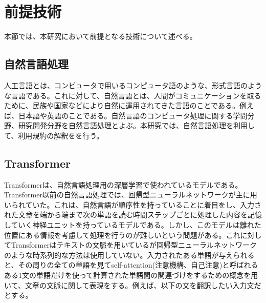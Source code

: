 


\section{前提技術}
本節では、本研究において前提となる技術について述べる。

\subsection{自然言語処理}
人工言語とは、コンピュータで用いるコンピュータ語のような、形式言語のような言語である。これに対して、自然言語とは、人間がコミュニケーションを取るために、民族や国家などにより自然に運用されてきた言語のことである。例えば、日本語や英語のことである。自然言語のコンピュータ処理に関する学問分野、研究開発分野を自然言語処理とよぶ\cite{黒橋禎夫2019-03-20}。本研究では、自然言語処理を利用して、利用規約の解釈をを行う。

\subsection{Transformer}
Transformer\cite{https://doi.org/10.48550/arxiv.1706.03762}は、自然言語処理用の深層学習で使われているモデルである。Transformer以前の自然言語処理では、回帰型ニューラルネットワークが主に用いられていた。これは、自然言語が順序性を持っていることに着目をし、入力された文章を端から端まで次の単語を読む時間ステップごとに処理した内容を記憶していく神経ユニットを持っているモデルである\cite{TheUnrea66:online}。しかし、このモデルは離れた位置にある情報を考慮して処理を行うのが難しいという問題がある。これに対してTransformerはテキストの文脈を用いているが回帰型ニューラルネットワークのような時系列的な方法は使用していない。入力されたある単語が与えられると、その周りの全ての単語を見てself-attention(注意機構、自己注意)と呼ばれるある1文の単語だけを使って計算された単語間の関連づけをするための概念を用いて、文章の文脈に関して表現をする。例えば、以下の文を翻訳したい入力文だとする。


